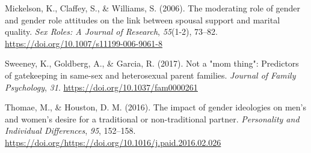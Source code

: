 \documentclass[
  english,
  man]{apa6}
\begin{document}
\leavevmode\hypertarget{ref-6c1621b9e66c4c4aa10336b4dd32bfe3}{}%
Mickelson, K., Claffey, S., \& Williams, S. (2006). The moderating role of gender and gender role attitudes on the link between spousal support and marital quality. \emph{Sex Roles: A Journal of Research}, \emph{55}(1-2), 73--82. \url{https://doi.org/10.1007/s11199-006-9061-8}

\leavevmode\hypertarget{ref-articlesween}{}%
Sweeney, K., Goldberg, A., \& Garcia, R. (2017). Not a "mom thing": Predictors of gatekeeping in same-sex and heterosexual parent families. \emph{Journal of Family Psychology}, \emph{31}. \url{https://doi.org/10.1037/fam0000261}

\leavevmode\hypertarget{ref-THOMAE2016152}{}%
Thomae, M., \& Houston, D. M. (2016). The impact of gender ideologies on men's and women's desire for a traditional or non-traditional partner. \emph{Personality and Individual Differences}, \emph{95}, 152--158. \url{https://doi.org/https://doi.org/10.1016/j.paid.2016.02.026}

\endgroup
\end{document}
